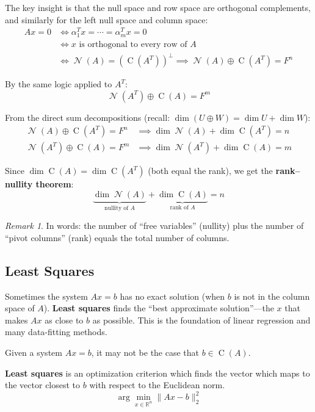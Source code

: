\documentclass[11pt]{article}
\theoremstyle{definition}
\theoremstyle{plain}
\theoremstyle{remark}
\newtheorem{remark}[definition]{Remark}
\DeclareMathOperator{\Null}{\mathcal{N}}
\DeclareMathOperator{\Col}{C}
\begin{document}
The key insight is that the null space and row space are orthogonal complements, and similarly for the left null space and column space:
\begin{align*}
Ax = 0 &\iff \alpha_1^T x = \cdots = \alpha_m^T x = 0 \\
&\iff x \text{ is orthogonal to every row of } A \\
&\iff \Null(A) = (\Col(A^T))^\perp \implies \boxed{\Null(A) \oplus \Col(A^T) = F^n}
\end{align*}

By the same logic applied to $A^T$:
\[
\boxed{\Null(A^T) \oplus \Col(A) = F^m}
\]

From the direct sum decompositions (recall: $\dim(U \oplus W) = \dim U + \dim W$):
\begin{align*}
\Null(A) \oplus \Col(A^T) = F^n &\implies \dim \Null(A) + \dim \Col(A^T) = n \\
\Null(A^T) \oplus \Col(A) = F^m &\implies \dim \Null(A^T) + \dim \Col(A) = m
\end{align*}

Since $\dim \Col(A) = \dim \Col(A^T)$ (both equal the rank), we get the \textbf{rank--nullity theorem}:
\[
\boxed{\underbrace{\dim \Null(A)}_{\text{nullity of } A} + \underbrace{\dim \Col(A)}_{\text{rank of } A} = n}
\]

\begin{remark}
In words: the number of ``free variables'' (nullity) plus the number of ``pivot columns'' (rank) equals the total number of columns.
\end{remark}

\subsection{Least Squares}

\begin{intuitionbox}
Sometimes the system $Ax = b$ has no exact solution (when $b$ is not in the column space of $A$). \textbf{Least squares} finds the ``best approximate solution''---the $x$ that makes $Ax$ as close to $b$ as possible. This is the foundation of linear regression and many data-fitting methods.
\end{intuitionbox}

Given a system $Ax = b$, it may not be the case that $b \in \Col(A)$.

\textbf{Least squares} is an optimization criterion which finds the vector which maps to the vector closest to $b$ with respect to the Euclidean norm.
\[
\arg\min_{x \in \mathbb{R}^n} \|Ax - b\|_2^2
\]
\end{document}
